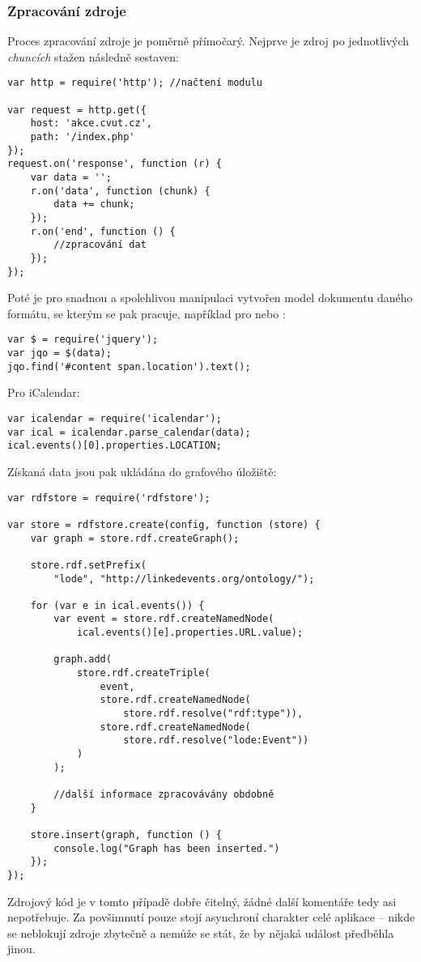 \subsubsection{Zpracování zdroje}
Proces zpracování zdroje je poměrně přímočarý. Nejprve je zdroj po jednotlivých \textit{chuncích} stažen následně sestaven:
\begin{verbatim}
var http = require('http'); //načtení modulu

var request = http.get({
    host: 'akce.cvut.cz',
    path: '/index.php'
});
request.on('response', function (r) {
    var data = '';
    r.on('data', function (chunk) {
        data += chunk;
    });
    r.on('end', function () {
        //zpracování dat
    });
});
\end{verbatim}
Poté je pro snadnou a spolehlivou manipulaci vytvořen model dokumentu daného formátu, se kterým se pak pracuje, například pro  nebo :
\begin{verbatim}
var $ = require('jquery');
var jqo = $(data);
jqo.find('#content span.location').text();
\end{verbatim}
Pro iCalendar:
\begin{verbatim}
var icalendar = require('icalendar');
var ical = icalendar.parse_calendar(data);
ical.events()[0].properties.LOCATION;
\end{verbatim}
Získaná data jsou pak ukládána do grafového úložiště:
\begin{verbatim}
var rdfstore = require('rdfstore');

var store = rdfstore.create(config, function (store) {
    var graph = store.rdf.createGraph();

    store.rdf.setPrefix(
        "lode", "http://linkedevents.org/ontology/");

    for (var e in ical.events()) {
        var event = store.rdf.createNamedNode(
            ical.events()[e].properties.URL.value);

        graph.add(
            store.rdf.createTriple(
                event,
                store.rdf.createNamedNode(
                    store.rdf.resolve("rdf:type")),
                store.rdf.createNamedNode(
                    store.rdf.resolve("lode:Event"))
            )
        );

        //další informace zpracovávány obdobně
    }

    store.insert(graph, function () {
        console.log("Graph has been inserted.")
    });
});
\end{verbatim}
Zdrojový kód je v tomto případě dobře čitelný, žádné další komentáře tedy asi nepotřebuje. Za povšimnutí pouze stojí asynchroní charakter celé aplikace -- nikde se neblokují zdroje zbytečně a nemůže se stát, že by nějaká událost předběhla jinou.

